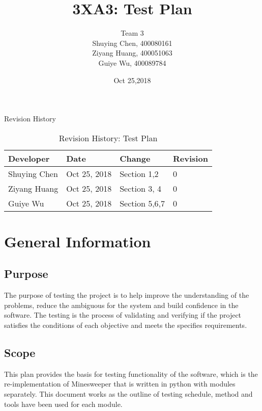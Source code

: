 \documentclass[12pt, titlepage]{article}
\title{3XA3: Test Plan}
\author{Team 3\\
        Shuying Chen, 400080161\\
        Ziyang Huang, 400051063\\
        Guiye Wu, 400089784
}
\date{Oct 25,2018}
\begin{document}
\maketitle
\newpage






{Revision History}
\begin{table}[h!]
    \caption{Revision History: Test Plan}
    \begin{center}
	\begin{tabular}{|p{2.5cm}|p{2.0cm}||p{2.0cm}|p{2.0cm}|}
	\hline
	\textbf{Developer} & \textbf{Date} & \textbf{Change} & \textbf{Revision}\\
	\hline
      Shuying Chen & Oct 25, 2018 & Section 1,2 & 0\\
      \hline
      Ziyang Huang & Oct 25, 2018 & Section 3, 4 & 0\\
      \hline
      Guiye Wu & Oct 25, 2018 & Section 5,6,7 & 0\\
      \hline
	\end{tabular}
    \end{center}
	\end{table}
	\newpage
{}

\maketitle

\tableofcontents
\newpage
\listoftables
\listoffigures
\newpage

\section{General Information}

\subsection{Purpose}
The purpose of testing the project is to help improve the understanding of the problems, reduce the ambiguous for the system and build confidence in the software. The testing is the process of validating and verifying if the project satisfies the conditions of each objective and meets the specifies requirements.
\subsection{Scope}
This plan provides the basis for testing functionality of the software, which is the re-implementation of Minesweeper that is written in python with modules separately.
This document works as the outline of testing schedule, method and tools have been used for each module. 
\end{document}
